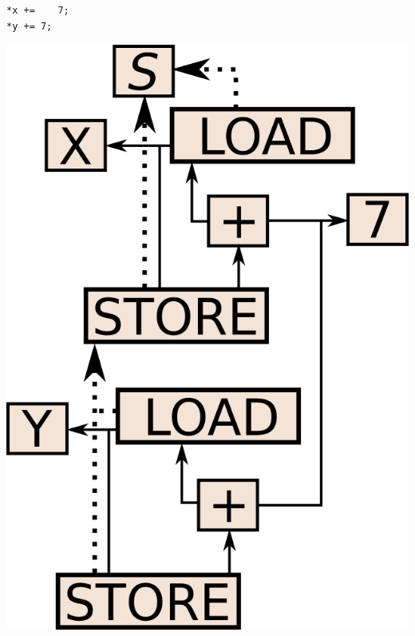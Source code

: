 \begin{centering}
	\noindent\begin{minipage}{0.36\textwidth}
		\begin{CenteredBox}
		\begin{lstlisting}[label={lst:load_dependence_ex},
style=minipage_customcpp, basicstyle=\fontsize{10}{1}]
*x +=	 7;
*y += 7;
		\end{lstlisting}
		\end{CenteredBox}
	\end{minipage}
	\noindent\begin{minipage}{0.55\textwidth}
		\captionsetup{type=figure}
		\includegraphics[width=\textwidth]{figures/load_store_state_dependence_ex}
	\end{minipage}
	\label{fig:load_dependence_ex}
\end{centering}

